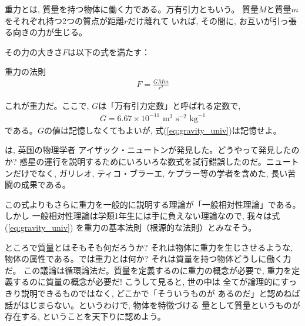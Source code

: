 重力とは, 質量を持つ物体に働く力である。万有引力ともいう。
質量$M$と質量$m$をそれぞれ持つ2つの質点が距離$r$だけ離れて
いれば, その間に, お互いが引っ張る向きの力が生じる。

その力の大きさ$F$は以下の式を満たす：
\begin{itembox}{重力の法則}
\begin{eqnarray}
F=\frac{GMm}{r^2}\label{eq:gravity_univ}
\end{eqnarray}
\end{itembox}
これが重力だ。ここで, $G$は「万有引力定数」と呼ばれる定数で, 
\begin{eqnarray}
G=6.67\times 10^{-11}\text{ m}^3\text{ s}^{-2}\text{ kg}^{-1}
\end{eqnarray}
である。$G$の値は記憶しなくてもよいが, 式(\ref{eq:gravity_univ})は記憶せよ。

は, 英国の物理学者
アイザック・ニュートンが発見した。どうやって発見したのか? 
惑星の運行を説明するためにいろいろな数式を試行錯誤したのだ。ニュートンだけでなく, 
ガリレオ, ティコ・ブラーエ, ケプラー等の学者を含めた, 長い苦闘の成果である。

この式よりもさらに重力を一般的に説明する理論が「一般相対性理論」である。しかし
一般相対性理論は学類1年生には手に負えない理論なので, 我々は式(\ref{eq:gravity_univ})
を重力の基本法則（根源的な法則）とみなそう。\mv

ところで質量とはそもそも何だろうか? それは物体に重力を生じさせるような, 
物体の属性である。では重力とは何か? それは質量を持つ物体どうしに働く力だ。
この議論は循環論法だ。質量を定義するのに重力の概念が必要で, 
重力を定義するのに質量の概念が必要だ! こうして見ると, 世の中は
全てが論理的にすっきり説明できるものではなく, どこかで「そういうものが
あるのだ」と認めねば話がはじまらない。というわけで, 物体を特徴づける
量として質量というものが存在する, ということを天下りに認めよう。\mv

